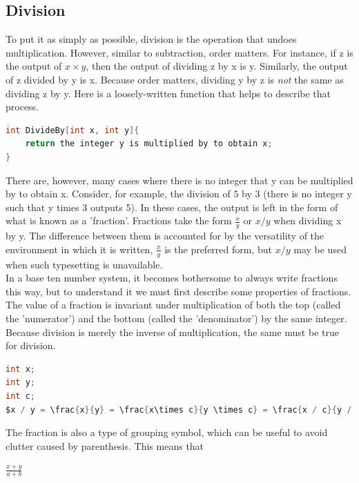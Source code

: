 \subsection{Division}
To put it as simply as possible, division is the operation that undoes multiplication. However, similar to subtraction, order matters. For instance, if z is the output of $x\times y$, then the output of dividing z by x is y. Similarly, the output of z divided by y is x. Because order matters, dividing y by z is \emph{not} the same as dividing z by y. Here is a loosely-written function that helps to describe that process.
\begin{center}
\begin{lstlisting}[language=C,caption=Division Function,label=lst:divFunc]
int DivideBy[int x, int y]{
	return the integer y is multiplied by to obtain x;
}
\end{lstlisting}
\end{center}
There are, however, many cases where there is no integer that y can be multiplied by to obtain x. Consider, for example, the division of $5$ by $3$ (there is no integer y such that y times 3 outputs 5). In these cases, the output is left in the form of what is known as a 'fraction'. Fractions take the form $\frac{x}{y}$ or $x/y$ when dividing x by y. The difference between them is accounted for by the versatility of the environment in which it is written, $\frac{x}{y}$ is the preferred form, but $x/y$ may be used when such typesetting is unavailable. \\
In a base ten number system, it becomes bothersome to always write fractions this way, but to understand it we must first describe some properties of fractions. \\
The value of a fraction is invariant under multiplication of both the top (called the 'numerator') and the bottom (called the 'denominator') by the same integer. Because division is merely the inverse of multiplication, the same must be true for division.
\begin{center}
\begin{lstlisting}[language=C,caption=Fraction Properties,label=lst:fracProp,mathescape]
int x;
int y;
int c;
$x / y = \frac{x}{y} = \frac{x\times c}{y \times c} = \frac{x / c}{y / c}$
\end{lstlisting}
\end{center}
The fraction is also a type of grouping symbol, which can be useful to avoid clutter caused by parenthesis. This means that
\begin{center}
$\frac{x+y}{a+b}$
\end{center}
